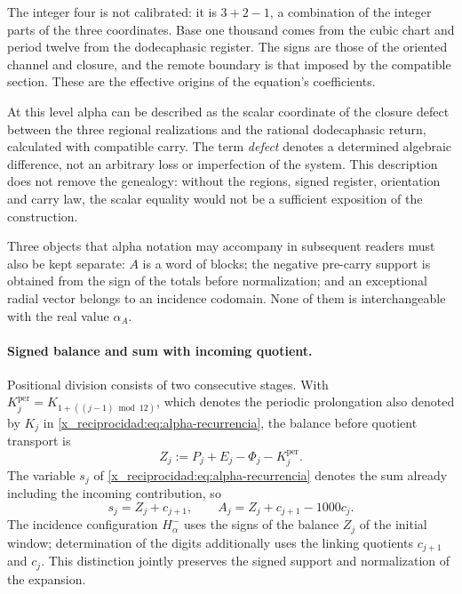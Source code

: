 The integer four is not calibrated: it is
\(3+2-1\), a combination of the integer parts of the three coordinates.
Base one thousand comes from the cubic chart and period twelve from the dodecaphasic register. The
signs are those of the oriented channel and closure, and the remote boundary is
that imposed by the compatible section. These are the effective origins of
the equation's coefficients.

At this level alpha can be described as the scalar coordinate of the
closure defect between the three regional realizations and the rational
dodecaphasic return, calculated with compatible carry. The term
\emph{defect} denotes a determined algebraic difference, not an
arbitrary loss or imperfection of the system. This description does not
remove the genealogy: without the regions, signed register,
orientation and carry law, the scalar equality would not be a
sufficient exposition of the construction.

Three objects that alpha notation may accompany in subsequent readers
must also be kept separate: \(A\) is a word of
blocks; the negative pre-carry support is obtained from the sign of the
totals before normalization; and an exceptional radial vector belongs to
an incidence codomain. None of them is interchangeable with the
real value \(\alpha_A\).


\paragraph{Signed balance and sum with incoming quotient.}
\label{x_reciprocidad:ampl-alfa-z-s-aclaracion}
Positional division consists of two consecutive stages. With
\(K_j^{\mathrm{per}}=K_{1+((j-1)\bmod12)}\), which denotes the
periodic prolongation also denoted by \(K_j\) in
\eqref{x_reciprocidad:eq:alpha-recurrencia}, the balance before quotient
transport is
\[
 Z_j:=P_j+E_j-\Phi_j-K_j^{\mathrm{per}}.
\]
The variable $s_j$ of \eqref{x_reciprocidad:eq:alpha-recurrencia} denotes the sum already
including the incoming contribution, so
\[
 s_j=Z_j+c_{j+1},\qquad
 A_j=Z_j+c_{j+1}-1000c_j.
\]
The incidence configuration
$H^-_\alpha$ uses the signs of the balance $Z_j$ of the initial window;
determination of the digits additionally uses the linking quotients
$c_{j+1}$ and $c_j$. This distinction jointly preserves the signed
support and normalization of the expansion.

